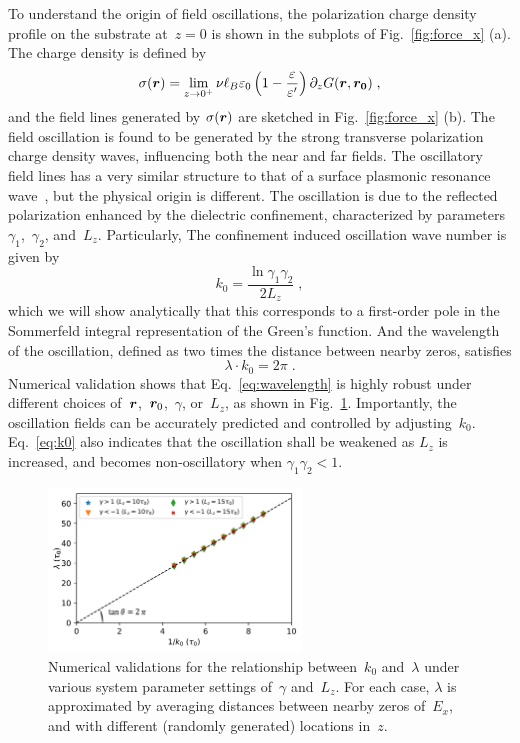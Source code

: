 To understand the origin of field oscillations, the polarization charge density profile on the substrate at~$z=0$ is shown in the subplots of Fig.~\ref{fig:force_x} (a). 
The charge density is defined by 
\begin{equation}
    \sigma(\boldsymbol{r}) = \lim_{z \to 0^+} \nu \ell_B \varepsilon_0  \left( 1 - \frac{\varepsilon}{\varepsilon'} \right) \partial_z G(\boldsymbol{r}, \boldsymbol{r_0})\;,
\end{equation}
and the field lines generated by $\sigma(\boldsymbol{r})$ are sketched in Fig.~\ref{fig:force_x} (b). 
The field oscillation is found to be generated by the strong transverse polarization charge density waves, influencing both the near and far fields. 
The oscillatory field lines has a very similar structure to that of a surface plasmonic resonance wave~\cite{willets2007localized}, but the physical origin is different. 
The oscillation is due to the reflected polarization enhanced by the dielectric confinement, characterized by parameters~$\gamma_1$,~$\gamma_2$, and~$L_z$. Particularly,
The confinement induced oscillation wave number is given by
\begin{equation}\label{eq:k0}
    k_0 = \frac{\ln{\gamma_1 \gamma_2}}{2 L_z}\;,
\end{equation}
which we will show analytically that this corresponds to a first-order pole in the Sommerfeld integral representation of the Green's function.
And the wavelength of the oscillation, defined as two times the distance between nearby zeros, satisfies 
\begin{equation}\label{eq:wavelength}
    \lambda \cdot k_0 = 2 \pi \;.
\end{equation}
Numerical validation shows that Eq.~\eqref{eq:wavelength} is highly robust under different choices of~$\boldsymbol{r}$,~$\boldsymbol{r}_0$,~$\gamma$, or~$L_z$, as shown in Fig.~\ref{fig:k_wavelegth}.
Importantly, the oscillation fields can be accurately predicted and controlled by adjusting~$k_0$. 
Eq.~\eqref{eq:k0} also indicates that the oscillation shall be weakened as $L_z$ is increased, and becomes non-oscillatory when $\gamma_1\gamma_2<1$.

\begin{figure}[htbp]
    \centering
    \includegraphics[width=0.6\textwidth]{figs/fig3.pdf}
    \caption{
        Numerical validations for the relationship between~$k_0$ and~$\lambda$ under various system parameter settings of~$\gamma$ and~$L_z$. For each case, $\lambda$ is approximated by averaging distances between nearby zeros of~$E_x$, and with different (randomly generated) locations in~$z$. 
    }
    \label{fig:k_wavelegth}
\end{figure}


